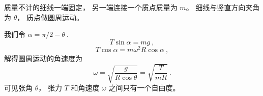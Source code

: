 
\begin{issues}
\issueDraft
\end{issues}



质量不计的细线一端固定， 另一端连接一个质点质量为 $m$。 细线与竖直方向夹角为 $\theta$， 质点做圆周运动。

我们令 $\alpha = \pi/2 - \theta~.$
\begin{equation}
T\sin\alpha = mg~,
\end{equation}
\begin{equation}
T\cos\alpha = m\omega^2 R\cos\alpha~,
\end{equation}
解得圆周运动的角速度为
\begin{equation}
\omega = \sqrt{\frac{g}{R\cos\theta}} = \sqrt{\frac{T}{mR}}~.
\end{equation}
可见张角 $\theta$， 张力 $T$ 和角速度 $\omega$ 之间只有一个自由度。
